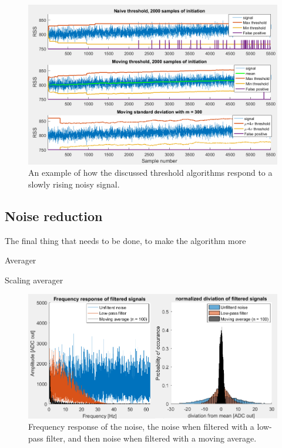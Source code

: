 
\begin{figure}
	\includegraphics[width=\textwidth]{pics/NaiveVSsigmaThreshold.png}
	\caption{An example of how the discussed threshold algorithms respond to a slowly rising noisy signal.}
	\label{fig:Threshold}
\end{figure}

\subsection{Noise reduction}
The final thing that needs to be done, to make the algorithm more 

Averager \cite{Confidence_interval}

Scaling averager \cite{Confidence_interval}

\begin{figure}
	\includegraphics[width=\textwidth]{pics/FiltersVsNoise.png}
	\caption{Frequency response of the noise, the noise when filtered with a low-pass filter, and then noise when filtered with a moving average.}
	\label{fig:FilterVsNoise}
\end{figure}

